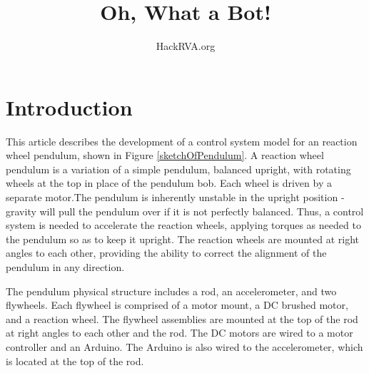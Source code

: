 \documentclass[12pt,letterpaper]{article}
\begin{document}
\title{Oh, What a Bot!}
\author{HackRVA.org}
\date{}
\maketitle



\section{Introduction}
This article describes the development of a control system model for an reaction wheel pendulum, shown in Figure \ref{sketchOfPendulum}.  A reaction wheel pendulum is a variation of a simple pendulum, balanced upright, with rotating wheels
at the top in place of the pendulum bob. Each wheel is driven by a separate motor.The pendulum is inherently unstable in the upright position - gravity will pull the pendulum over if it is not perfectly balanced.  Thus, a control system is needed to accelerate the reaction wheels, applying torques
as needed to the pendulum so as to keep it upright. The reaction wheels are mounted at right angles to each other, providing the ability to 
correct the alignment of the pendulum in any direction.

The pendulum physical structure includes a rod, an accelerometer, and two flywheels.  Each
flywheel is comprised of a motor mount, a DC brushed motor, and a reaction wheel.  The flywheel assemblies are mounted at
the top of the rod at right angles to each other and the rod.  The DC motors are wired to a motor controller and an Arduino.  The Arduino is also wired
to the accelerometer, which is located at the top of the rod.
\end{document}
